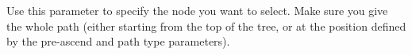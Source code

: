 Use this parameter to specify the node you want to select. Make sure you give the whole path (either starting from the top of the tree, or at the position defined by the pre-ascend and path type parameters).



